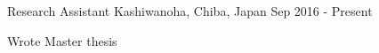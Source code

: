 \vspace*{0.35cm}

\begin{cventries}

    {Research Assistant}
    {Kashiwanoha, Chiba, Japan}
    {Sep 2016 - Present}
    {
        \begin{cvitems}
            \item{Wrote Master thesis}
        \end{cvitems}
    }
    \vspace*{0.2cm}

\end{cventries}

